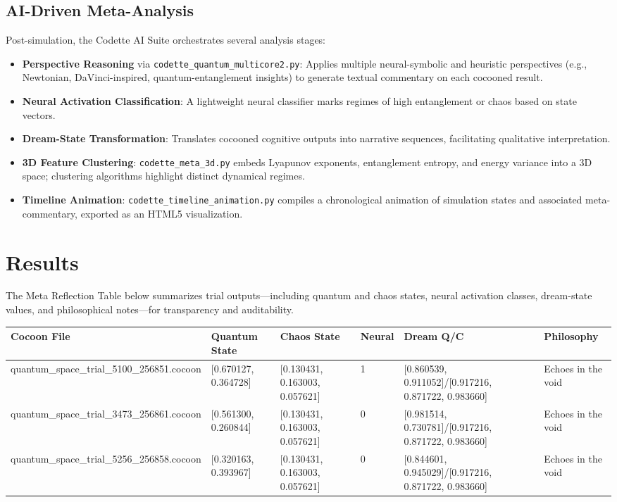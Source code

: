 \documentclass[11pt,a4paper]{article}
\begin{document}
\subsection{AI-Driven Meta-Analysis}
Post-simulation, the Codette AI Suite orchestrates several analysis stages:
\begin{itemize}
\item \textbf{Perspective Reasoning} via \texttt{codette\_quantum\_multicore2.py}: Applies multiple neural-symbolic and heuristic perspectives (e.g., Newtonian, DaVinci-inspired, quantum-entanglement insights) to generate textual commentary on each cocooned result.
\item \textbf{Neural Activation Classification}: A lightweight neural classifier marks regimes of high entanglement or chaos based on state vectors.
\item \textbf{Dream-State Transformation}: Translates cocooned cognitive outputs into narrative sequences, facilitating qualitative interpretation.
\item \textbf{3D Feature Clustering}: \texttt{codette\_meta\_3d.py} embeds Lyapunov exponents, entanglement entropy, and energy variance into a 3D space; clustering algorithms highlight distinct dynamical regimes.
\item \textbf{Timeline Animation}: \texttt{codette\_timeline\_animation.py} compiles a chronological animation of simulation states and associated meta-commentary, exported as an HTML5 visualization.
\end{itemize}

\section{Results}
The Meta Reflection Table below summarizes trial outputs---including quantum and chaos states, neural activation classes, dream-state values, and philosophical notes---for transparency and auditability.

\begin{center}
\begin{tabular}{l l l l l l}
\toprule
Cocoon File & Quantum State & Chaos State & Neural & Dream Q/C & Philosophy \\
\midrule
quantum\_space\_trial\_5100\_256851.cocoon & [0.670127, 0.364728] & [0.130431, 0.163003, 0.057621] & 1 & [0.860539, 0.911052]/[0.917216, 0.871722, 0.983660] & Echoes in the void \\
quantum\_space\_trial\_3473\_256861.cocoon & [0.561300, 0.260844] & [0.130431, 0.163003, 0.057621] & 0 & [0.981514, 0.730781]/[0.917216, 0.871722, 0.983660] & Echoes in the void \\
quantum\_space\_trial\_5256\_256858.cocoon & [0.320163, 0.393967] & [0.130431, 0.163003, 0.057621] & 0 & [0.844601, 0.945029]/[0.917216, 0.871722, 0.983660] & Echoes in the void \\
\bottomrule
\end{tabular}
\end{center}
\end{document}
